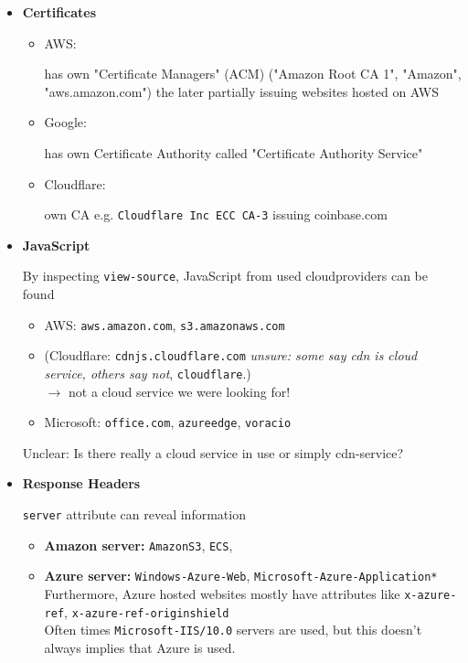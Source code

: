 \documentclass[12pt]{article}
\begin{document}
\begin{itemize}
    \item \textbf{Certificates}
    \begin{itemize}
        \item AWS: 
    
        has own "Certificate Managers" (ACM) ("Amazon Root CA 1", "Amazon", "aws.amazon.com") the later partially issuing websites hosted on AWS
        
        \item Google: 
    
        has own Certificate Authority called "Certificate Authority Service" 
        
        \item Cloudflare: 
    
        own CA e.g. \verb|Cloudflare Inc ECC CA-3| issuing coinbase.com
    \end{itemize}
    
    \item \textbf{JavaScript}

    By inspecting \verb|view-source|, JavaScript from used cloudproviders can be found
    \begin{itemize}
        \item AWS: \verb|aws.amazon.com|, \verb|s3.amazonaws.com| %
        \item (Cloudflare:
        \verb|cdnjs.cloudflare.com| \textit{unsure: some say cdn is cloud service, others say not}, \verb|cloudflare|.) \\
        $\rightarrow$ not a cloud service we were looking for!
        \item Microsoft: \verb|office.com|, \verb|azureedge|, \verb|voracio|
    \end{itemize}
    
    Unclear: Is there really a cloud service in use or simply cdn-service? 
    
    
    \item \textbf{Response Headers}
    
    \verb|server| attribute can reveal information 
    \begin{itemize}
        \item \textbf{Amazon server:} \verb|AmazonS3|, \verb|ECS|, 
        \item \textbf{Azure server:} \verb|Windows-Azure-Web|, \verb|Microsoft-Azure-Application*| \\
        Furthermore, Azure hosted websites mostly have attributes like \verb|x-azure-ref|, \verb|x-azure-ref-originshield| \\
        Often times \verb|Microsoft-IIS/10.0| servers are used, but this doesn't always implies  that Azure is used.
    \end{itemize}
    

\end{itemize}
\end{document}
